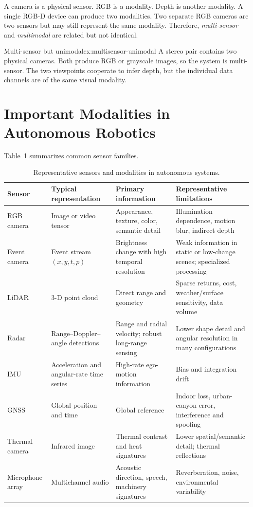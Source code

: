 A camera is a physical sensor. RGB is a modality. Depth is another modality. A single RGB-D device can produce two modalities. Two separate RGB cameras are two sensors but may still represent the same modality. Therefore, \emph{multi-sensor} and \emph{multimodal} are related but not identical.

\begin{example}{Multi-sensor but unimodal}{ex:multisensor-unimodal}
A stereo pair contains two physical cameras. Both produce RGB or grayscale images, so the system is multi-sensor. The two viewpoints cooperate to infer depth, but the individual data channels are of the same visual modality.
\end{example}

\section{Important Modalities in Autonomous Robotics}

Table~\ref{tab:sensor-families} summarizes common sensor families.

\begin{table}[H]
\centering
\caption{Representative sensors and modalities in autonomous systems.}
\label{tab:sensor-families}
\begin{tabularx}{\textwidth}{@{}p{2.25cm}p{2.9cm}X X@{}}
\toprule
\textbf{Sensor} & \textbf{Typical representation} & \textbf{Primary information} & \textbf{Representative limitations} \\
\midrule
RGB camera & Image or video tensor & Appearance, texture, color, semantic detail & Illumination dependence, motion blur, indirect depth \\
Event camera & Event stream \((x,y,t,p)\) & Brightness change with high temporal resolution & Weak information in static or low-change scenes; specialized processing \\
LiDAR & 3-D point cloud & Direct range and geometry & Sparse returns, cost, weather/surface sensitivity, data volume \\
Radar & Range--Doppler--angle detections & Range and radial velocity; robust long-range sensing & Lower shape detail and angular resolution in many configurations \\
IMU & Acceleration and angular-rate time series & High-rate ego-motion information & Bias and integration drift \\
GNSS & Global position and time & Global reference & Indoor loss, urban-canyon error, interference and spoofing \\
Thermal camera & Infrared image & Thermal contrast and heat signatures & Lower spatial/semantic detail; thermal reflections \\
Microphone array & Multichannel audio & Acoustic direction, speech, machinery signatures & Reverberation, noise, environmental variability \\
\bottomrule
\end{tabularx}
\end{table}

